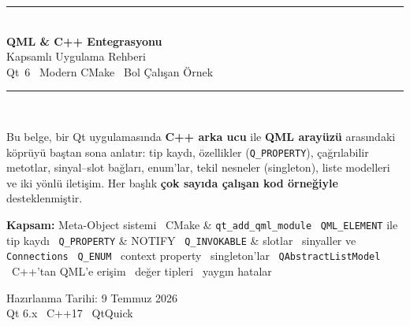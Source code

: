 \documentclass[11pt,a4paper]{article}
\newcommand{\kod}[1]{\texttt{\color{koyuGri}#1}}
\begin{document}
\begin{titlepage}
\centering
\vspace*{1.6cm}
{\color{qtYesil}\rule{\textwidth}{2pt}}\\[6pt]
{\color{anaMavi}\Huge\bfseries QML \& C++ Entegrasyonu}\\[10pt]
{\color{vurguMavi}\LARGE Kapsamlı Uygulama Rehberi}\\[8pt]
{\color{ortaGri}\large Qt~6 \textbullet\ Modern CMake \textbullet\ Bol Çalışan Örnek}\\[6pt]
{\color{qtYesil}\rule{\textwidth}{2pt}}\\[1.6cm]

\begin{tcolorbox}[width=0.88\textwidth,colback=acikMavi,colframe=vurguMavi,arc=4pt,boxrule=1pt]
\centering\large
Bu belge, bir Qt uygulamasında \textbf{C++ arka ucu} ile \textbf{QML arayüzü}
arasındaki köprüyü baştan sona anlatır: tip kaydı, özellikler (\kod{Q\_PROPERTY}),
çağrılabilir metotlar, sinyal--slot bağları, enum'lar, tekil nesneler (singleton),
liste modelleri ve iki yönlü iletişim. Her başlık \textbf{çok sayıda çalışan kod
örneğiyle} desteklenmiştir.
\end{tcolorbox}

\vspace{0.9cm}
\begin{tcolorbox}[width=0.88\textwidth,colback=acikGri,colframe=ortaGri!50,arc=3pt,boxrule=0.6pt]
\small
\textbf{Kapsam:} Meta-Object sistemi \textbullet\ CMake \& \kod{qt\_add\_qml\_module}
\textbullet\ \kod{QML\_ELEMENT} ile tip kaydı \textbullet\ \kod{Q\_PROPERTY} \&
NOTIFY \textbullet\ \kod{Q\_INVOKABLE} \& slotlar \textbullet\ sinyaller ve
\kod{Connections} \textbullet\ \kod{Q\_ENUM} \textbullet\ context property
\textbullet\ singleton'lar \textbullet\ \kod{QAbstractListModel} \textbullet\
C++'tan QML'e erişim \textbullet\ değer tipleri \textbullet\ yaygın hatalar
\end{tcolorbox}

\vfill
{\color{ortaGri}\large Hazırlanma Tarihi: 9 Temmuz 2026}\\[4pt]
{\color{ortaGri} Qt 6.x \textbullet\ C++17 \textbullet\ QtQuick}
\vspace*{0.6cm}
\end{titlepage}

\tableofcontents
\thispagestyle{empty}
\clearpage

\end{document}
